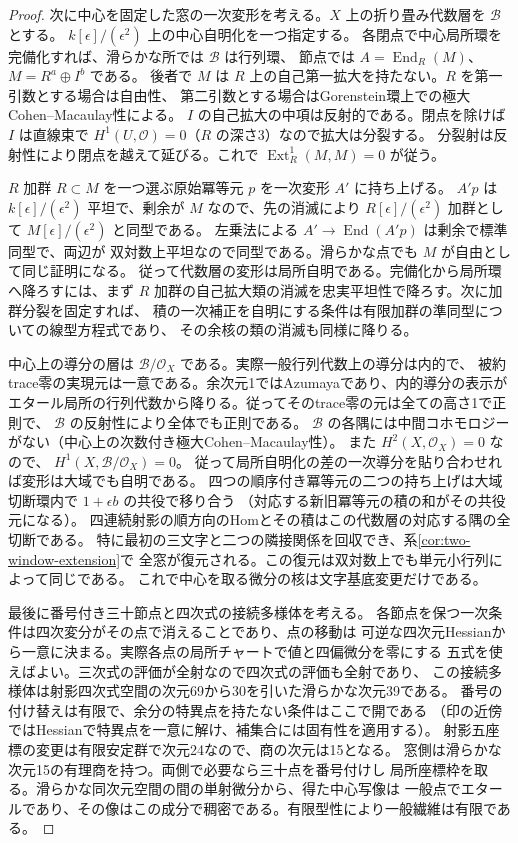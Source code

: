 \begin{proof}
次に中心を固定した窓の一次変形を考える。$X$ 上の折り畳み代数層を $\mathcal B$ とする。
$k[\epsilon]/(\epsilon^2)$ 上の中心自明化を一つ指定する。
各閉点で中心局所環を完備化すれば、滑らかな所では $\mathcal B$ は行列環、
節点では $A=\operatorname{End}_R(M)$、$M=R^a\oplus I^b$ である。
後者で $M$ は $R$ 上の自己第一拡大を持たない。$R$ を第一引数とする場合は自由性、
第二引数とする場合はGorenstein環上での極大Cohen--Macaulay性による。
$I$ の自己拡大の中項は反射的である。閉点を除けば $I$ は直線束で
$H^1(U,\mathcal O)=0$（$R$ の深さ3）なので拡大は分裂する。
分裂射は反射性により閉点を越えて延びる。これで $\operatorname{Ext}^1_R(M,M)=0$ が従う。

$R$ 加群 $R\subset M$ を一つ選ぶ原始冪等元 $p$ を一次変形 $A'$ に持ち上げる。
$A'p$ は $k[\epsilon]/(\epsilon^2)$ 平坦で、剰余が $M$ なので、先の消滅により
$R[\epsilon]/(\epsilon^2)$ 加群として $M[\epsilon]/(\epsilon^2)$ と同型である。
左乗法による $A'\to\operatorname{End}(A'p)$ は剰余で標準同型で、両辺が
双対数上平坦なので同型である。滑らかな点でも $M$ が自由として同じ証明になる。
従って代数層の変形は局所自明である。完備化から局所環へ降ろすには、まず
$R$ 加群の自己拡大類の消滅を忠実平坦性で降ろす。次に加群分裂を固定すれば、
積の一次補正を自明にする条件は有限加群の準同型についての線型方程式であり、
その余核の類の消滅も同様に降りる。

中心上の導分の層は $\mathcal B/\mathcal O_X$ である。実際一般行列代数上の導分は内的で、
被約trace零の実現元は一意である。余次元1ではAzumayaであり、内的導分の表示が
エタール局所の行列代数から降りる。従ってそのtrace零の元は全ての高さ1で正則で、
$\mathcal B$ の反射性により全体でも正則である。
$\mathcal B$ の各隅には中間コホモロジーがない（中心上の次数付き極大Cohen--Macaulay性）。
また $H^2(X,\mathcal O_X)=0$ なので、
$H^1(X,\mathcal B/\mathcal O_X)=0$。
従って局所自明化の差の一次導分を貼り合わせれば変形は大域でも自明である。
四つの順序付き冪等元の二つの持ち上げは大域切断環内で $1+\epsilon b$ の共役で移り合う
（対応する新旧冪等元の積の和がその共役元になる）。
四連続射影の順方向のHomとその積はこの代数層の対応する隅の全切断である。
特に最初の三文字と二つの隣接関係を回収でき、系\ref{cor:two-window-extension}で
全窓が復元される。この復元は双対数上でも単元小行列によって同じである。
これで中心を取る微分の核は文字基底変更だけである。

最後に番号付き三十節点と四次式の接続多様体を考える。
各節点を保つ一次条件は四次変分がその点で消えることであり、点の移動は
可逆な四次元Hessianから一意に決まる。実際各点の局所チャートで値と四偏微分を零にする
五式を使えばよい。三次式の評価が全射なので四次式の評価も全射であり、
この接続多様体は射影四次式空間の次元69から30を引いた滑らかな次元39である。
番号の付け替えは有限で、余分の特異点を持たない条件はここで開である
（印の近傍ではHessianで特異点を一意に解け、補集合には固有性を適用する）。
射影五座標の変更は有限安定群で次元24なので、商の次元は15となる。
窓側は滑らかな次元15の有理商を持つ。両側で必要なら三十点を番号付けし
局所座標枠を取る。滑らかな同次元空間の間の単射微分から、得た中心写像は
一般点でエタールであり、その像はこの成分で稠密である。有限型性により一般繊維は有限である。
\end{proof}
